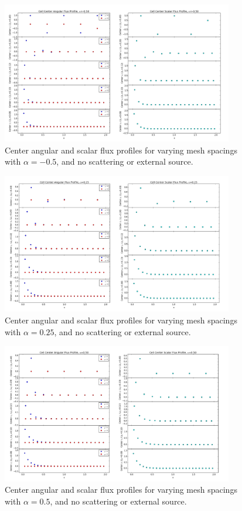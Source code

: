 \documentclass[10pt]{article}
\begin{document}
\begin{figure}[H]
    \centering
    \includegraphics[width=0.9\textwidth]{Figures/FluxProfile_a=-05}
    \caption{Center angular and scalar flux profiles for varying mesh spacings with $\alpha = -0.5$, and no scattering or external source.}
    \label{fig4}
\end{figure}

\begin{figure}[H]
    \centering
    \includegraphics[width=0.9\textwidth]{Figures/FluxProfile_a=025}
    \caption{Center angular and scalar flux profiles for varying mesh spacings with $\alpha = 0.25$, and no scattering or external source.}
    \label{fig5}
\end{figure}

\begin{figure}[H]
    \centering
    \includegraphics[width=0.9\textwidth]{Figures/FluxProfile_a=05}
    \caption{Center angular and scalar flux profiles for varying mesh spacings with $\alpha = 0.5$, and no scattering or external source.}
    \label{fig6}
\end{figure}
\end{document}
